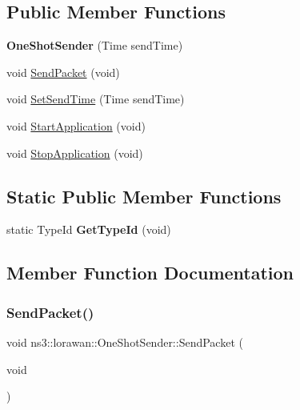 \subsection*{Public Member Functions}
\begin{DoxyCompactItemize}
\item 
\mbox{\label{classns3_1_1lorawan_1_1OneShotSender_a03b4032ed451f9d93b69eb98fcdcd167}} 
{\bfseries One\+Shot\+Sender} (Time send\+Time)
\item 
void \hyperlink{classns3_1_1lorawan_1_1OneShotSender_a1f01ac23df1cde70305ebc4530a5bd04}{Send\+Packet} (void)
\item 
void \hyperlink{classns3_1_1lorawan_1_1OneShotSender_ad2e2d481f9332896e2328ea21790a994}{Set\+Send\+Time} (Time send\+Time)
\item 
void \hyperlink{classns3_1_1lorawan_1_1OneShotSender_aa957e6ecac972a05314f25a9313aafd7}{Start\+Application} (void)
\item 
void \hyperlink{classns3_1_1lorawan_1_1OneShotSender_a1014b9f4f5ef8b38f15885c2db109a84}{Stop\+Application} (void)
\end{DoxyCompactItemize}
\subsection*{Static Public Member Functions}
\begin{DoxyCompactItemize}
\item 
\mbox{\label{classns3_1_1lorawan_1_1OneShotSender_a18f605e016c33a44900c4ab1377c42b6}} 
static Type\+Id {\bfseries Get\+Type\+Id} (void)
\end{DoxyCompactItemize}


\subsection{Member Function Documentation}
\mbox{\label{classns3_1_1lorawan_1_1OneShotSender_a1f01ac23df1cde70305ebc4530a5bd04}} 
\subsubsection{\texorpdfstring{Send\+Packet()}{SendPacket()}}
{\footnotesize\ttfamily void ns3\+::lorawan\+::\+One\+Shot\+Sender\+::\+Send\+Packet (\begin{DoxyParamCaption}\item[{void}]{ }\end{DoxyParamCaption})}

